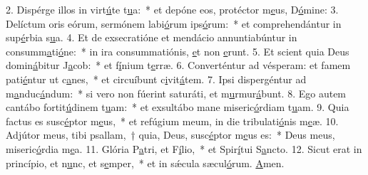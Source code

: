 2. Dispérge illos in virt\uline{ú}te t\uline{u}a:~* et depóne eos, protéctor m\uline{e}us, D\uline{ó}mine:
3. Delíctum oris eórum, sermónem labi\uline{ó}rum ips\uline{ó}rum:~* et comprehendántur in sup\uline{é}rbia s\uline{u}a.
4. Et de exsecratióne et mendácio annuntiabúntur in consumm\uline{a}ti\uline{ó}ne:~* in ira consummatiónis, \uline{e}t non \uline{e}runt.
5. Et scient quia Deus domin\uline{á}bitur J\uline{a}cob:~* et f\uline{í}nium t\uline{e}rræ.
6. Converténtur ad vésperam: et famem pati\uline{é}ntur ut c\uline{a}nes,~* et circuíbunt c\uline{i}vit\uline{á}tem.
7. Ipsi dispergéntur ad m\uline{a}nduc\uline{á}ndum:~* si vero non fúerint saturáti, et m\uline{u}rmur\uline{á}bunt.
8. Ego autem cantábo fortit\uline{ú}dinem t\uline{u}am:~* et exsultábo mane miseric\uline{ó}rdiam t\uline{u}am.
9. Quia factus es susc\uline{é}ptor m\uline{e}us,~* et refúgium meum, in die tribulati\uline{ó}nis m\uline{e}æ.
10. Adjútor meus, tibi psallam,~† quia, Deus, susc\uline{é}ptor m\uline{e}us es:~* Deus meus, miseric\uline{ó}rdia m\uline{e}a.
11. Glória P\uline{a}tri, et F\uline{í}lio,~* et Spir\uline{í}tui S\uline{a}ncto.
12. Sicut erat in princípio, et n\uline{u}nc, et s\uline{e}mper,~* et in sǽcula sæcul\uline{ó}rum. \uline{A}men.
